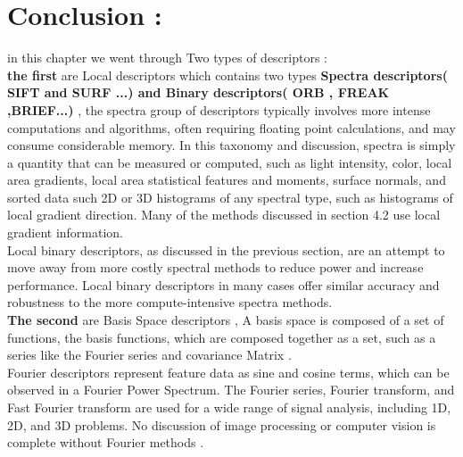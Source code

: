  \section{ Conclusion : }
 in this chapter we went through Two types of descriptors :\\
\textbf{the first} are  Local descriptors which contains two types \textbf{Spectra descriptors( SIFT and SURF ...) and Binary descriptors( ORB , FREAK ,BRIEF...)} , the spectra group of descriptors typically involves more intense computations and algorithms, often requiring floating point
calculations, and may consume considerable memory. In this taxonomy and discussion,
spectra is simply a quantity that can be measured or computed, such as light intensity,
color, local area gradients, local area statistical features and moments, surface normals,
and sorted data such 2D or 3D histograms of any spectral type, such as histograms of
local gradient direction. Many of the methods discussed in section 4.2 use local gradient
information.\\
Local binary descriptors, as discussed in the previous section, are an attempt
to move away from more costly spectral methods to reduce power and increase
performance. Local binary descriptors in many cases offer similar accuracy and
robustness to the more compute-intensive spectra methods. \\
\textbf{The second } are Basis Space descriptors   , A basis space is composed of a set of functions, the basis functions, which are
composed together as a set, such as a series like the Fourier series and covariance Matrix  . \\
Fourier descriptors represent feature data as sine and cosine terms, which can be
observed in a Fourier Power Spectrum. The Fourier series, Fourier transform, and Fast
Fourier transform are used for a wide range of signal analysis, including 1D, 2D, and 3D
problems. No discussion of image processing or computer vision is complete without
Fourier methods .